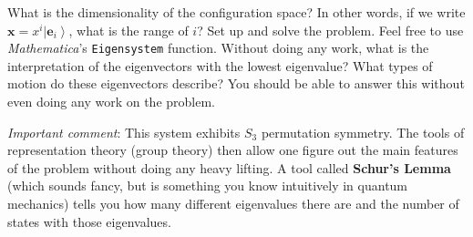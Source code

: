 \documentclass[12pt]{article}
\numberwithin{equation}{section}    %
\renewcommand{\vec}[1]{\mathbf{#1}} %
\begin{document}
What is the dimensionality of the configuration space? In other words, if we write $\vec{x} = x^i \left|\vec{e}_i\right\rangle$, what is the range of $i$? Set up and solve the problem. Feel free to use \emph{Mathematica}'s \texttt{Eigensystem} function. Without doing any work, what is the interpretation of the eigenvectors with the lowest eigenvalue? What types of motion do these eigenvectors describe? You should be able to answer this without even doing any work on the problem.

\emph{Important comment}: This system exhibits $S_3$ permutation symmetry. The tools of representation theory (group theory) then allow one figure out the main features of the problem without doing any heavy lifting. A tool called \textbf{Schur's Lemma} (which sounds fancy, but is something you know intuitively in quantum mechanics) tells you how many different eigenvalues there are and the number of states with those eigenvalues. 




\end{document}
